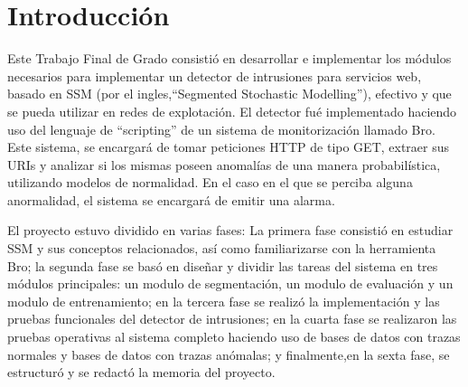\chapter*{Introducción}
\label{intro}




Este Trabajo Final de Grado consistió en desarrollar e implementar los módulos necesarios para implementar un detector de intrusiones para servicios web, basado en SSM (por el ingles,``Segmented Stochastic Modelling'')\cite{ssm}, efectivo y que se pueda utilizar en redes de explotación. El detector fué implementado haciendo uso del lenguaje de ``scripting'' de un sistema de monitorización llamado Bro. Este sistema, se encargará de tomar peticiones HTTP de tipo GET, extraer sus URIs y analizar si los mismas poseen anomalías de una manera probabilística, utilizando modelos de normalidad. En el caso en el que se perciba alguna anormalidad, el sistema se encargará de emitir una alarma.
 
El proyecto estuvo dividido en varias fases: La primera fase consistió en estudiar SSM y sus conceptos relacionados, así como familiarizarse con la herramienta Bro; la segunda fase se basó en diseñar y dividir las tareas del sistema en tres módulos principales: un modulo de segmentación, un modulo de evaluación y un modulo de entrenamiento; en la tercera fase se realizó la implementación y las pruebas funcionales del detector de intrusiones; en la cuarta fase se realizaron las pruebas operativas al sistema completo haciendo uso de bases de datos con trazas normales y bases de datos con trazas anómalas; y finalmente,en la sexta fase, se estructuró y se redactó la memoria del proyecto.







